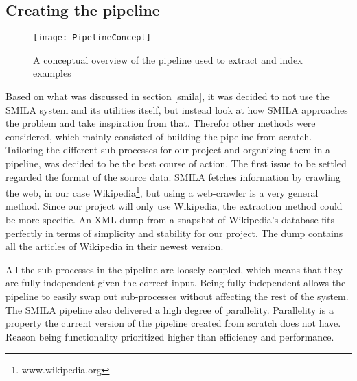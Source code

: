 \subsection{Creating the pipeline} \label{custom-pipeline}


\begin{figure}[h]
\caption{A conceptual overview of the pipeline used to extract and index examples}
\texttt{[image: PipelineConcept]}
\end{figure}



Based on what was discussed in section \ref{smila}, it was decided to not use the SMILA system and its utilities itself, but instead look at how SMILA approaches the problem and take inspiration from that. Therefor other methods were considered, which mainly consisted of building the pipeline from scratch. Tailoring the different sub-processes for our project and organizing them in a pipeline, was decided to be the best course of action. The first issue to be settled regarded the format of the source data. SMILA fetches information by crawling the web, in our case Wikipedia\footnote{www.wikipedia.org}, but using a web-crawler is a very general method. Since our project will only use Wikipedia, the extraction method could be more specific. An XML-dump from a snapshot of Wikipedia's database fits perfectly in terms of simplicity and stability for our project. The dump contains all the articles of Wikipedia in their newest version.


All the sub-processes in the pipeline are loosely coupled, which means that they are fully independent given the correct input. Being fully independent allows the pipeline to easily swap out sub-processes without affecting the rest of the system. The SMILA pipeline also delivered a high degree of parallelity. Parallelity is a property the current version of the pipeline created from scratch does not have. Reason being functionality prioritized higher than efficiency and performance. 

